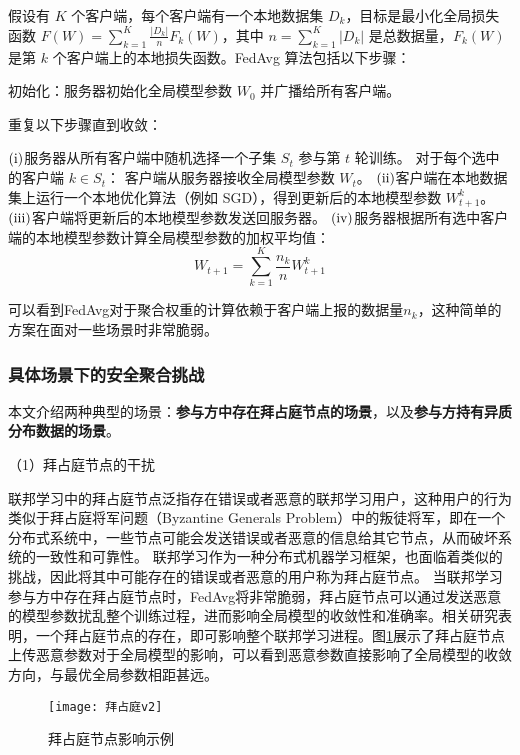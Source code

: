 假设有 $K$ 个客户端，每个客户端有一个本地数据集 ${D}_k$，目标是最小化全局损失函数 $F(W) = \sum_{k=1}^K \frac{|{D}_k|}{n} F_k(W)$，其中 $n = \sum_{k=1}^K |{D}_k|$ 是总数据量，$F_k(W)$ 是第 $k$ 个客户端上的本地损失函数。FedAvg 算法包括以下步骤：

初始化：服务器初始化全局模型参数 $W_0$ 并广播给所有客户端。

重复以下步骤直到收敛：

$(\rm \romannumeral1)$服务器从所有客户端中随机选择一个子集 $S_t$ 参与第 $t$ 轮训练。
对于每个选中的客户端 $k \in S_t$：
客户端从服务器接收全局模型参数 $W_t$。
$(\rm \romannumeral2)$客户端在本地数据集上运行一个本地优化算法（例如 SGD），得到更新后的本地模型参数 $W_{t+1}^k$。
$(\rm \romannumeral3)$客户端将更新后的本地模型参数发送回服务器。
$(\rm \romannumeral4)$服务器根据所有选中客户端的本地模型参数计算全局模型参数的加权平均值：
\begin{equation}
	W_{t+1} = \sum_{k=1}^K \frac{n_k}{n} W_{t+1}^k
\end{equation}

可以看到FedAvg对于聚合权重的计算依赖于客户端上报的数据量$n_k$，这种简单的方案在面对一些场景时非常脆弱。

\subsubsection{具体场景下的安全聚合挑战}
本文介绍两种典型的场景：\textbf{参与方中存在拜占庭节点的场景}，以及\textbf{参与方持有异质分布数据的场景}。

（1）拜占庭节点的干扰

联邦学习中的拜占庭节点泛指存在错误或者恶意的联邦学习用户，这种用户的行为类似于拜占庭将军问题（Byzantine Generals Problem）中的叛徒将军，即在一个分布式系统中，一些节点可能会发送错误或者恶意的信息给其它节点，从而破坏系统的一致性和可靠性\cite{zhai2021byzantine}。
联邦学习作为一种分布式机器学习框架，也面临着类似的挑战，因此将其中可能存在的错误或者恶意的用户称为拜占庭节点\cite{zhai2020byzantine}。
当联邦学习参与方中存在拜占庭节点时，FedAvg将非常脆弱，拜占庭节点可以通过发送恶意的模型参数扰乱整个训练过程，进而影响全局模型的收敛性和准确率。相关研究表明，一个拜占庭节点的存在，即可影响整个联邦学习进程\cite{blanchard2017machine}。图\ref{byzantine}展示了拜占庭节点上传恶意参数对于全局模型的影响，可以看到恶意参数直接影响了全局模型的收敛方向，与最优全局参数相距甚远。

\begin{figure}[htbp]
	\centering
	\texttt{[image: 拜占庭v2]}
	\caption{拜占庭节点影响示例}
	\label{byzantine}
\end{figure}

